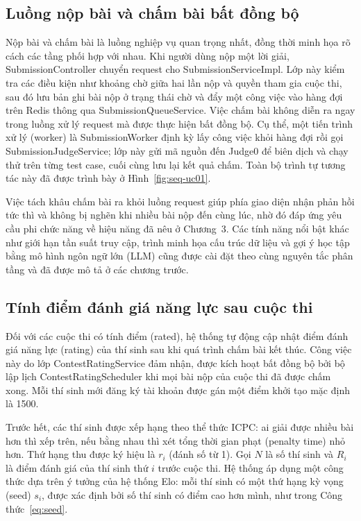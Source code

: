 \documentclass[12pt, a4paper]{report}
\begin{document}
\subsection{Luồng nộp bài và chấm bài bất đồng bộ}\label{subsec:submit-flow}

Nộp bài và chấm bài là luồng nghiệp vụ quan trọng nhất, đồng thời minh họa rõ cách các tầng
phối hợp với nhau. Khi người dùng nộp một lời giải, SubmissionController chuyển request cho
SubmissionServiceImpl. Lớp này kiểm tra các điều kiện như khoảng chờ giữa hai lần nộp và quyền
tham gia cuộc thi, sau đó lưu bản ghi bài nộp ở trạng thái chờ và đẩy một công việc vào hàng
đợi trên Redis thông qua SubmissionQueueService. Việc chấm bài không diễn ra ngay trong luồng
xử lý request mà được thực hiện bất đồng bộ. Cụ thể, một tiến trình xử lý (worker) là
SubmissionWorker định kỳ lấy công việc khỏi hàng đợi rồi gọi SubmissionJudgeService; lớp này
gửi mã nguồn đến Judge0 để biên dịch và chạy thử trên từng test case, cuối cùng lưu
lại kết quả chấm. Toàn bộ trình tự tương tác này đã được trình bày ở Hình~\ref{fig:seq-uc01}.

Việc tách khâu chấm bài ra khỏi luồng request giúp phía giao diện nhận phản hồi tức thì và
không bị nghẽn khi nhiều bài nộp đến cùng lúc, nhờ đó đáp ứng yêu cầu phi chức năng về hiệu
năng đã nêu ở Chương~3. Các tính năng nổi bật khác như giới hạn tần suất truy cập, trình minh họa
cấu trúc dữ liệu và gợi ý học tập bằng mô hình ngôn ngữ lớn (\ac{LLM}) cũng được cài đặt theo
cùng nguyên tắc phân tầng và đã được mô tả ở các chương trước.

\subsection{Tính điểm đánh giá năng lực sau cuộc thi}

Đối với các cuộc thi có tính điểm (rated), hệ thống tự động cập nhật điểm đánh giá năng lực
(rating) của thí sinh sau khi quá trình chấm bài kết thúc. Công việc này do lớp
ContestRatingService đảm nhận, được kích hoạt bất đồng bộ bởi bộ lập lịch ContestRatingScheduler
khi mọi bài nộp của cuộc thi đã được chấm xong. Mỗi thí sinh mới đăng ký tài khoản được gán một điểm
khởi tạo mặc định là 1500.

Trước hết, các thí sinh được xếp hạng theo thể thức ICPC: ai giải được nhiều bài hơn thì xếp
trên, nếu bằng nhau thì xét tổng thời gian phạt (penalty time) nhỏ hơn. Thứ hạng thu được ký
hiệu là $r_i$ (đánh số từ 1). Gọi $N$ là số thí sinh và $R_i$ là điểm đánh giá của thí sinh
thứ $i$ trước cuộc thi. Hệ thống áp dụng một công thức dựa trên ý tưởng của hệ thống Elo: mỗi
thí sinh có một thứ hạng kỳ vọng (seed) $s_i$, được xác định bởi số thí sinh có điểm cao hơn
mình, như trong Công thức~\eqref{eq:seed}.
\end{document}
